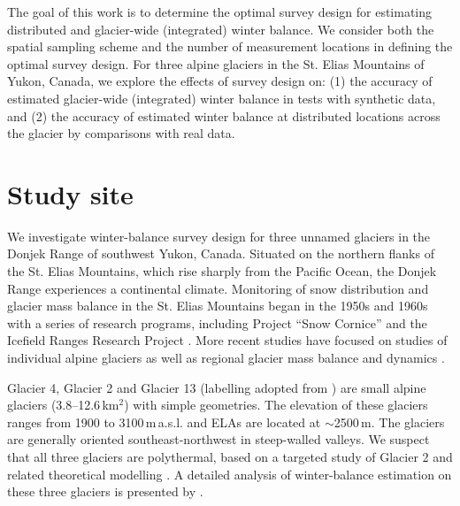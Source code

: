 \documentclass[twocolumn,letterpaper]{igs}
\begin{document}

The goal of this work is to determine the optimal survey design for estimating distributed and glacier-wide (integrated) winter balance. We consider both the spatial sampling scheme and the number of measurement locations in defining the optimal survey design. For three alpine glaciers in the St. Elias Mountains of Yukon, Canada, we explore the effects of survey design on: 
(1) the accuracy of estimated glacier-wide (integrated) winter balance in tests with synthetic data, and  
(2) the accuracy of estimated winter balance at distributed locations across the glacier by comparisons with real data. 



\section{Study site}

We investigate winter-balance survey design for three unnamed glaciers in the Donjek Range of southwest Yukon, Canada. Situated on the northern flanks of the St. Elias Mountains, which rise sharply from the Pacific Ocean, the Donjek Range experiences a continental climate. Monitoring of snow distribution and glacier mass balance in the St. Elias Mountains began in the 1950s and 1960s with a series of research programs, including Project ``Snow Cornice''  and the Icefield Ranges Research Project \citep{Wood1948, Danby2003}. More recent studies have focused on studies of individual alpine glaciers \citep[e.g.][]{Clarke2014,Flowers2014} as well as regional glacier mass balance and dynamics \citep[e.g.][]{Arendt2008, Burgess2013,Waechter2015}. 

Glacier 4, Glacier 2 and Glacier 13 (labelling adopted from \cite{Crompton2016}) are small alpine glaciers (3.8--12.6\,km$^2$) with simple geometries. The elevation of these glaciers ranges from 1900 to 3100\,m\,a.s.l. and ELAs are located at $\sim$2500\,m. The glaciers are generally oriented southeast-northwest in steep-walled valleys. We suspect that all three glaciers are polythermal, based on a targeted study of Glacier 2 \citep{Wilson2013} and related theoretical modelling \citep{Wilson2013a}. A detailed analysis of winter-balance estimation on these three glaciers is presented by \cite{Pulwicki2017}.
\end{document}
